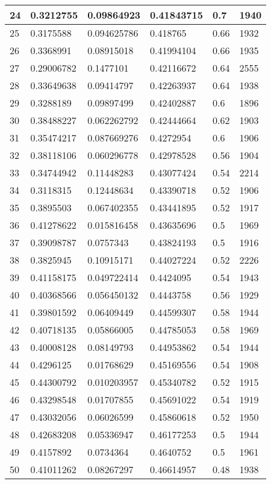 \begin{longtable}{|l|l|l|l|l|l|}
24 & 0.3212755 & 0.09864923 & 0.41843715 & 0.7 & 1940 \\ \hline 
25 & 0.3175588 & 0.094625786 & 0.418765 & 0.66 & 1932 \\ \hline 
26 & 0.3368991 & 0.08915018 & 0.41994104 & 0.66 & 1935 \\ \hline 
27 & 0.29006782 & 0.1477101 & 0.42116672 & 0.64 & 2555 \\ \hline 
28 & 0.33649638 & 0.09414797 & 0.42263937 & 0.64 & 1938 \\ \hline 
29 & 0.3288189 & 0.09897499 & 0.42402887 & 0.6 & 1896 \\ \hline 
30 & 0.38488227 & 0.062262792 & 0.42444664 & 0.62 & 1903 \\ \hline 
31 & 0.35474217 & 0.087669276 & 0.4272954 & 0.6 & 1906 \\ \hline 
32 & 0.38118106 & 0.060296778 & 0.42978528 & 0.56 & 1904 \\ \hline 
33 & 0.34744942 & 0.11448283 & 0.43077424 & 0.54 & 2214 \\ \hline 
34 & 0.3118315 & 0.12448634 & 0.43390718 & 0.52 & 1906 \\ \hline 
35 & 0.3895503 & 0.067402355 & 0.43441895 & 0.52 & 1917 \\ \hline 
36 & 0.41278622 & 0.015816458 & 0.43635696 & 0.5 & 1969 \\ \hline 
37 & 0.39098787 & 0.0757343 & 0.43824193 & 0.5 & 1916 \\ \hline 
38 & 0.3825945 & 0.10915171 & 0.44027224 & 0.52 & 2226 \\ \hline 
39 & 0.41158175 & 0.049722414 & 0.4424095 & 0.54 & 1943 \\ \hline 
40 & 0.40368566 & 0.056450132 & 0.4443758 & 0.56 & 1929 \\ \hline 
41 & 0.39801592 & 0.06409449 & 0.44599307 & 0.58 & 1944 \\ \hline 
42 & 0.40718135 & 0.05866005 & 0.44785053 & 0.58 & 1969 \\ \hline 
43 & 0.40008128 & 0.08149793 & 0.44953862 & 0.54 & 1944 \\ \hline 
44 & 0.4296125 & 0.01768629 & 0.45169556 & 0.54 & 1908 \\ \hline 
45 & 0.44300792 & 0.010203957 & 0.45340782 & 0.52 & 1915 \\ \hline 
46 & 0.43298548 & 0.01707855 & 0.45691022 & 0.54 & 1919 \\ \hline 
47 & 0.43032056 & 0.06026599 & 0.45860618 & 0.52 & 1950 \\ \hline 
48 & 0.42683208 & 0.05336947 & 0.46177253 & 0.5 & 1944 \\ \hline 
49 & 0.4157892 & 0.0734364 & 0.4640752 & 0.5 & 1961 \\ \hline 
50 & 0.41011262 & 0.08267297 & 0.46614957 & 0.48 & 1938 \\ \hline 
\end{longtable}